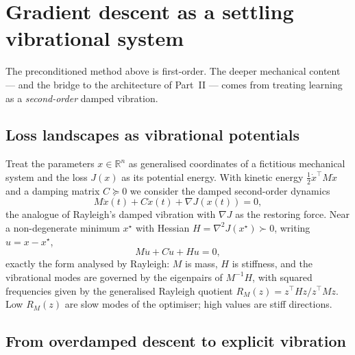 \documentclass[12pt,a4paper]{article}
\theoremstyle{plain}
\theoremstyle{definition}
\theoremstyle{remark}
\newcommand{\R}{\mathbb{R}}
\newcommand{\1}{\mathbf{1}}
\begin{document}
\section{Gradient descent as a settling vibrational system}
\label{sec:vibrational_gd}

The preconditioned method above is first-order. The deeper mechanical
content --- and the bridge to the architecture of Part~II --- comes from
treating learning as a \emph{second-order} damped vibration.

\subsection{Loss landscapes as vibrational potentials}

Treat the parameters $x \in \R^n$ as generalised coordinates of a
fictitious mechanical system and the loss $J(x)$ as its potential
energy. With kinetic energy $\frac{1}{2}\dot x^\top M \dot x$ and a
damping matrix $C \succeq 0$ we consider the damped second-order dynamics
\begin{equation}
    M \ddot x(t) + C \dot x(t) + \nabla J(x(t)) = 0,
    \label{eq:vibrational_gd_continuous}
\end{equation}
the analogue of Rayleigh's damped vibration with $\nabla J$ as the
restoring force. Near a non-degenerate minimum $x^\star$ with Hessian
$H = \nabla^2 J(x^\star) \succ 0$, writing $u = x - x^\star$,
\begin{equation}
    M \ddot u + C \dot u + H u = 0,
    \label{eq:linearized_vibration}
\end{equation}
exactly the form analysed by Rayleigh: $M$ is mass, $H$ is stiffness, and
the vibrational modes are governed by the eigenpairs of $M^{-1}H$, with
squared frequencies given by the generalised Rayleigh quotient
$R_M(z) = z^\top H z / z^\top M z$. Low $R_M(z)$ are slow modes of the
optimiser; high values are stiff directions.

\subsection{From overdamped descent to explicit vibration}
\end{document}
